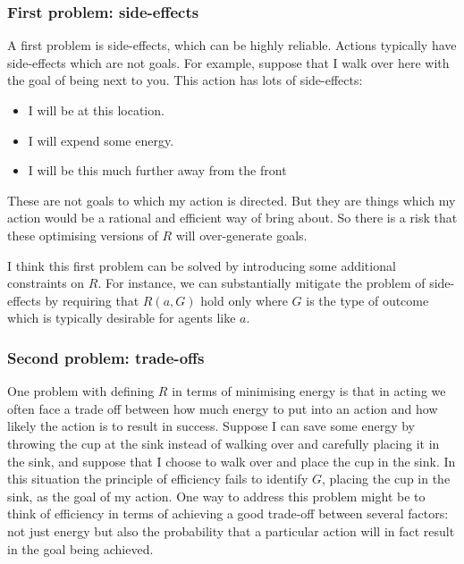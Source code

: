 \documentclass[12pt,\papersize]{extarticle}
\begin{document}
\subsubsection{First problem: side-effects}
A first problem is side-effects, which can be highly reliable.
Actions typically have side-effects which are not goals.
For example,
suppose that I walk over here with the goal of being next to you.
This action has lots of side-effects: 
\begin{itemize}
\item 	I will be at this location.
\item	I will expend some energy.
\item	I will be this much further away from the front
\end{itemize}
These  are not goals to which my action is directed.
But they are things which my action would be a rational and efficient way of bring about.
So there is a risk that these optimising versions of $R$ will over-generate goals.

I think this first problem can be solved by introducing some additional constraints on $R$.
For instance, we can substantially mitigate the problem of side-effects by requiring that $R(a,G)$ hold only where $G$ is the type of outcome which is typically desirable for agents like $a$.


\subsubsection{Second problem: trade-offs}
One problem with defining $R$ in terms of minimising energy is that in acting we often face a trade off between how much energy to put into an action and how likely the action is to result in success.
Suppose I can save some energy by throwing the cup at the sink instead of walking over and carefully placing it in the sink,
and suppose that I choose to walk over and place the cup in the sink.
In this situation the principle of efficiency fails to identify $G$, placing the cup in the sink, as the goal of my action.
One way to address this problem might be to think of efficiency in terms of achieving a good trade-off between several factors:
not just energy but also the probability that a particular action will in fact result in the goal being achieved.
\end{document}
